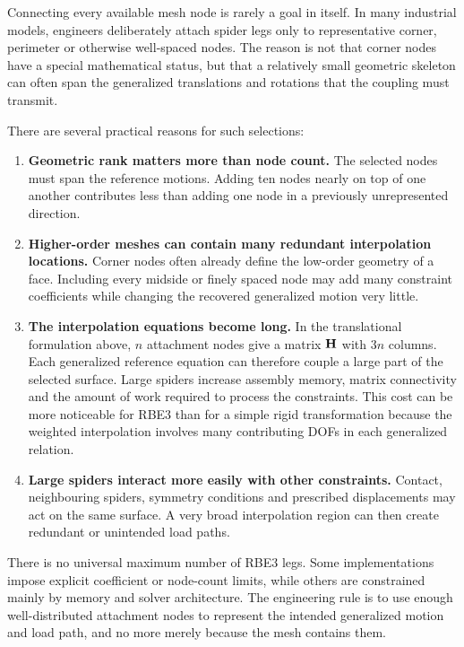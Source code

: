 Connecting every available mesh node is rarely a goal in itself. In many
industrial models, engineers deliberately attach spider legs only to
representative corner, perimeter or otherwise well-spaced nodes. The reason is
not that corner nodes have a special mathematical status, but that a relatively
small geometric skeleton can often span the generalized translations and
rotations that the coupling must transmit.

There are several practical reasons for such selections:

\begin{enumerate}
    \item \textbf{Geometric rank matters more than node count.}
          The selected nodes must span the reference motions. Adding ten nodes
          nearly on top of one another contributes less than adding one node in
          a previously unrepresented direction.

    \item \textbf{Higher-order meshes can contain many redundant interpolation
          locations.}
          Corner nodes often already define the low-order geometry of a face.
          Including every midside or finely spaced node may add many constraint
          coefficients while changing the recovered generalized motion very
          little.

    \item \textbf{The interpolation equations become long.}
          In the translational formulation above, $n$ attachment nodes give a
          matrix $\mathbf{H}$ with $3n$ columns. Each generalized reference equation
          can therefore couple a large part of the selected surface. Large
          spiders increase assembly memory, matrix connectivity and the amount
          of work required to process the constraints. This cost can be more
          noticeable for RBE3 than for a simple rigid transformation because the
          weighted interpolation involves many contributing DOFs in each
          generalized relation.

    \item \textbf{Large spiders interact more easily with other constraints.}
          Contact, neighbouring spiders, symmetry conditions and prescribed
          displacements may act on the same surface. A very broad interpolation
          region can then create redundant or unintended load paths.
\end{enumerate}

There is no universal maximum number of RBE3 legs. Some implementations impose
explicit coefficient or node-count limits, while others are constrained mainly
by memory and solver architecture. The engineering rule is to use enough
well-distributed attachment nodes to represent the intended generalized motion
and load path, and no more merely because the mesh contains them.

